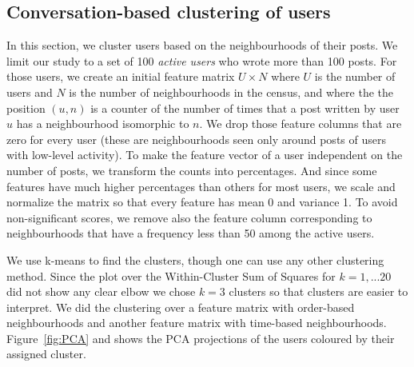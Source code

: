 \documentclass[conference]{IEEEtran}
\begin{document}
\subsection{Conversation-based clustering of users}
In this section, we cluster users based on the neighbourhoods of their posts. We limit our study to a set of 100 \textit{active users} who wrote more than 100 posts. For those users, we create an initial feature matrix $U\times N$ where $U$ is the number of users and $N$ is the number of neighbourhoods in the census, and where the the position $(u,n)$ is a counter of the number of times that a post written by user $u$ has a neighbourhood isomorphic to $n$. We drop those feature columns that are zero for every user (these are neighbourhoods seen only around posts of users with low-level activity). To make the feature vector of a user independent on the number of posts, we transform the counts into percentages. And since some features have much higher percentages than others for most users, we scale and normalize the matrix so that every feature has mean 0 and variance 1. To avoid non-significant scores, we remove also the feature column corresponding to neighbourhoods that have a frequency less than 50 among the active users.

We use k-means to find the clusters, though one can use any other clustering method. Since the plot over the Within-Cluster Sum of Squares for $k=1,...20$ did not show any clear elbow we chose $k=3$ clusters so that clusters are easier to interpret. We did the clustering over a feature matrix with order-based neighbourhoods and another feature matrix with time-based neighbourhoods. Figure~\ref{fig:PCA} and shows the PCA projections of the users coloured by their assigned cluster. 



\end{document}
